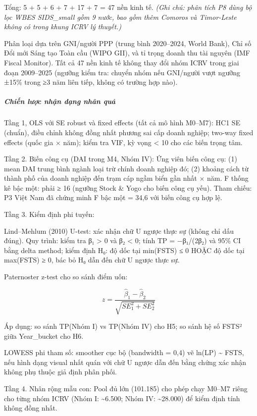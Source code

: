 \documentclass[12pt,a4paper]{article}
\begin{document}
Tổng: 5 + 5 + 6 + 7 + 17 + 7 = 47 nền kinh tế. \emph{(Ghi chú: phân tích
P8 dùng bộ lọc WBES SIDS\_small gồm 9 nước, bao gồm thêm Comoros và
Timor-Leste không có trong khung ICRV lý thuyết.)}

Phân loại dựa trên GNI/người PPP (trung bình 2020--2024, World Bank),
Chỉ số Đổi mới Sáng tạo Toàn cầu (WIPO GII), và tỉ trọng doanh thu tài
nguyên (IMF Fiscal Monitor). Tất cả 47 nền kinh tế không thay đổi nhóm
ICRV trong giai đoạn 2009--2025 (ngưỡng kiểm tra: chuyển nhóm nếu
GNI/người vượt ngưỡng ±15\% trong ≥3 năm liên tiếp, không có trường hợp
nào).

\hypertarget{chiux1ebfn-lux1b0ux1ee3c-nhux1eadn-dux1ea1ng-nhuxe2n-quux1ea3}{%
\subparagraph{Chiến lược nhận dạng nhân
quả}\label{chiux1ebfn-lux1b0ux1ee3c-nhux1eadn-dux1ea1ng-nhuxe2n-quux1ea3}}

Tầng 1, OLS với SE robust và fixed effects (tất cả mô hình M0--M7): HC1
SE (chuẩn), điều chỉnh không đồng nhất phương sai cấp doanh nghiệp;
two-way fixed effects (quốc gia × năm); kiểm tra VIF, kỳ vọng
\textless{} 10 cho các biến trọng tâm.

Tầng 2. Biến công cụ (DAI trong M4, Nhóm IV): Ứng viên biến công cụ: (1)
mean DAI trung bình ngành loại trừ chính doanh nghiệp đó; (2) khoảng
cách từ thành phố của doanh nghiệp đến trạm cáp ngầm biển gần nhất ×
năm. F thống kê bậc một: phải ≥ 16 (ngưỡng Stock \& Yogo cho biến công
cụ yếu). Tham chiếu: P3 Việt Nam đã chứng minh F bậc một = 34,6 với biến
công cụ hợp lệ.

Tầng 3. Kiểm định phi tuyến:

Lind--Mehlum (2010) U-test: xác nhận chữ U ngược thực sự (không chỉ dấu
đúng). Quy trình: kiểm tra β₁ \textgreater{} 0 và β₂ \textless{} 0; tính
TP = −β₁/(2β₂) và 95\% CI bằng delta method; kiểm định H₀: độ dốc tại
min(FSTS) ≤ 0 HOẶC độ dốc tại max(FSTS) ≥ 0, bác bỏ H₀ dẫn đến chữ U
ngược thực sự.

Paternoster z-test cho so sánh điểm uốn:

\[z = \frac{\hat{\beta}_1 - \hat{\beta}_2}{\sqrt{SE_1^2 + SE_2^2}}\]

Áp dụng: so sánh TP(Nhóm I) vs TP(Nhóm IV) cho H5; so sánh hệ số FSTS²
giữa Year\_bucket cho H6.

LOWESS phi tham số: smoother cục bộ (bandwidth = 0,4) vẽ ln(LP)
\textasciitilde{} FSTS, nếu hình dạng visual nhất quán với chữ U ngược
dẫn đến bằng chứng xác nhận không phụ thuộc giả định phân phối.

Tầng 4. Nhân rộng mẫu con: Pool đủ lớn (101.185) cho phép chạy M0--M7
riêng cho từng nhóm ICRV (Nhóm I: \textasciitilde6.500; Nhóm IV:
\textasciitilde28.000) để kiểm định tính không đồng nhất.
\end{document}
